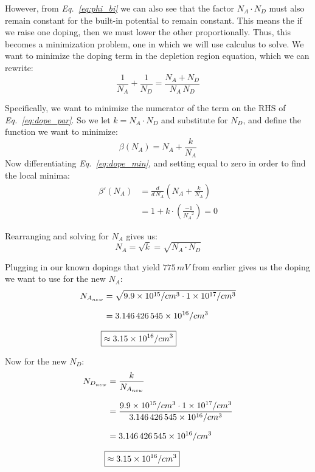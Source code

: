 \documentclass[12pt, fleqn]{article}
\begin{document}
\begin{enumerate}[label=(\alph*)]
{        However, from \textit{Eq.~\ref{eq:phi_bi}} we can also see that the factor $N_A \cdot N_D$ must also remain constant for the built-in potential to remain constant.  This means the if we raise one doping, then we must lower the other proportionally.  Thus, this becomes a minimization problem, one in which we will use calculus to solve.  We want to minimize the doping term in the depletion region equation, which we can rewrite:
        \begin{equation}
            \frac{1}{N_A} + \frac{1}{N_D} = \frac{N_A + N_D}{N_A\,N_D}
            \label{eq:dope_par}
        \end{equation}
        
        Specifically, we want to minimize the numerator of the term on the RHS of \textit{Eq.~\ref{eq:dope_par}}.  So we let $k = N_A \cdot N_D$ and substitute for $N_D$, and define the function we want to minimize:
        \begin{equation}
            \beta (N_A) = N_A + \frac{k}{N_A}
            \label{eq:dope_min}
        \end{equation}
        Now differentiating \textit{Eq.~\ref{eq:dope_min}}, and setting equal to zero in order to find the local minima:
        \begin{align*}
            \beta '(N_A) &= \frac{d}{d\,N_A}\left(N_A + \frac{k}{N_A}\right)\\[0.25cm]
            &= 1 + k \cdot \left(\frac{-1}{{N_A}^2}\right) = 0
        \end{align*}
        
        Rearranging and solving for $N_A$ gives us:
        \begin{equation}
            N_A = \sqrt{k} = \sqrt{N_A \cdot N_D}
            \label{eq:new_na}
        \end{equation}

        Plugging in our known dopings that yield $775\,mV$ from earlier gives us the doping we want to use for the new $N_A$:
        \begin{align*}
            N_{A_{new}} &= \sqrt{\num{9.9e15}/cm^3 \cdot \num{1e17}/cm^3}\\[0.25cm]
            &= \num{3.146426545e16}/cm^3\\[0.25cm]
            \Aboxed{&\approx \num{3.15e16}/cm^3}
        \end{align*}

        Now for the new $N_D$:
        \begin{align*}
            N_{D_{new}} &= \frac{k}{N_{A_{new}}}\\[0.25cm]
            &= \frac{\num{9.9e15}/cm^3 \cdot \num{1e17}/cm^3}{\num{3.146426545e16}/cm^3}\\[0.25cm]
            &= \num{3.146426545e16}/cm^3\\[0.25cm]
            \Aboxed{&\approx \num{3.15e16}/cm^3}
        \end{align*}

}
\end{enumerate}
\end{document}
